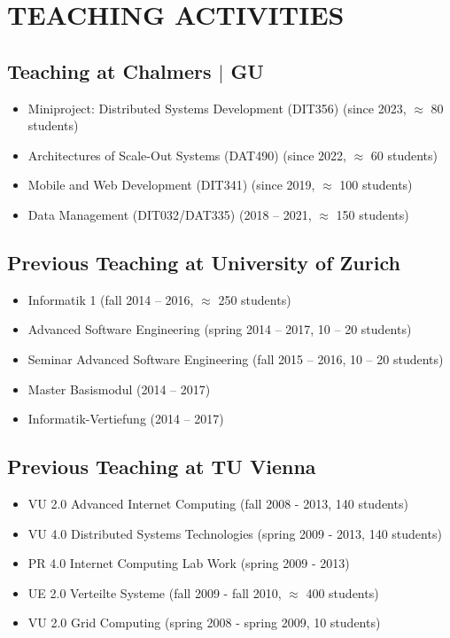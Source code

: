 \documentclass[paper=letter,fontsize=11pt]{scrartcl} %
\newcommand{\NewPart}[2]{\section*{\uppercase{#1} #2}}
\begin{document}
\NewPart{Teaching Activities}{}

\subsection*{Teaching at Chalmers $|$ GU}
\begin{itemize}
  \item Miniproject: Distributed Systems Development (DIT356) (since 2023, $\approx$ 80 students)
  \item Architectures of Scale-Out Systems (DAT490) (since 2022, $\approx$ 60 students)
	\item Mobile and Web Development (DIT341) (since 2019, $\approx$ 100 students)
  \item Data Management (DIT032/DAT335) (2018 -- 2021, $\approx$ 150 students)
\end{itemize}

\subsection*{Previous Teaching at University of Zurich}
\begin{itemize}
  \item Informatik 1 (fall 2014 -- 2016, $\approx$ 250 students)
  \item Advanced Software Engineering (spring 2014 -- 2017, 10 -- 20 students)
  \item Seminar Advanced Software Engineering (fall 2015 -- 2016, 10 -- 20 students)
  \item Master Basismodul (2014 -- 2017)
  \item Informatik-Vertiefung (2014 -- 2017)
\end{itemize}

\subsection*{Previous Teaching at TU Vienna}
\begin{itemize}
  \item VU 2.0 Advanced Internet Computing (fall 2008 - 2013, 140 students)
  \item VU 4.0 Distributed Systems Technologies (spring 2009 - 2013, 140 students)
  \item PR 4.0 Internet Computing Lab Work (spring 2009 - 2013)
  \item UE 2.0 Verteilte Systeme (fall 2009 - fall 2010, $\approx$ 400 students)
  \item VU 2.0 Grid Computing (spring 2008 - spring 2009, 10 students)
\end{itemize}
\end{document}
